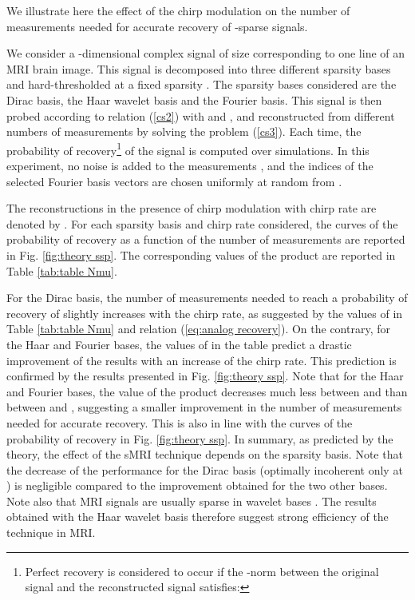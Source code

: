 \documentclass[10pt,draftcls, onecolumn]{IEEEtran}
\begin{document}
We illustrate here the effect of the chirp modulation on the number of measurements needed for accurate recovery of -sparse signals.

We consider a -dimensional complex signal  of size  corresponding to one line of an MRI brain image. This signal is decomposed into three different sparsity bases  and hard-thresholded at a fixed sparsity . The sparsity bases considered are the Dirac basis, the Haar wavelet basis and the Fourier basis. This signal is then probed according to relation (\ref{cs2}) with  and , and reconstructed from different numbers of measurements  by solving the  problem (\ref{cs3}). Each time, the probability of recovery\footnote{Perfect recovery is considered to occur if the -norm between the original signal  and the reconstructed signal  satisfies: } of the signal is computed over  simulations. In this experiment, no noise is added to the measurements , and the indices  of the selected Fourier basis vectors  are chosen uniformly at random from .

The  reconstructions in the presence of chirp modulation with chirp rate  are denoted by . For each sparsity basis and chirp rate considered, the curves of the probability of recovery as a function of the number of measurements  are reported in Fig. \ref{fig:theory ssp}. The corresponding values of the product  are reported in Table \ref{tab:table Nmu}. 

For the Dirac basis, the number of measurements needed to reach a probability of recovery of  slightly increases with the chirp rate, as suggested by the values of  in Table \ref{tab:table Nmu} and relation (\ref{eq:analog recovery}). On the contrary, for the Haar and Fourier bases, the values of  in the table predict a drastic improvement of the results with an increase of the chirp rate. This prediction is confirmed by the results presented in Fig. \ref{fig:theory ssp}. Note that for the Haar and Fourier bases, the value of the product  decreases much less between  and  than between  and , suggesting a smaller improvement in the number of measurements needed for accurate recovery. This is also in line with the curves of the probability of recovery in Fig. \ref{fig:theory ssp}. In summary, as predicted by the theory, the effect of the sMRI technique depends on the sparsity basis. Note that the decrease of the performance for the Dirac basis (optimally incoherent only at ) is negligible compared to the improvement obtained for the two other bases. Note also that MRI signals are usually sparse in wavelet bases \cite{lustig07}. The results obtained with the Haar wavelet basis therefore suggest strong efficiency of the technique in MRI.
\end{document}
